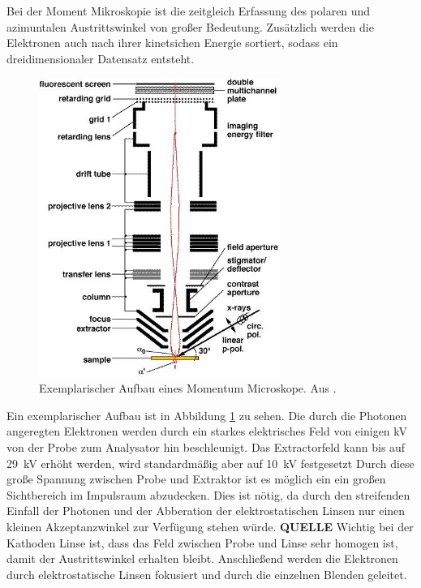         Bei der Moment Mikroskopie ist die zeitgleich Erfassung des polaren und azimuntalen Austrittswinkel von großer Bedeutung. 
        Zusätzlich werden die Elektronen auch nach ihrer kinetsichen Energie sortiert, sodass ein dreidimensionaler Datensatz entsteht.

        \begin{figure}
            \centering
            \includegraphics[width=0.7\textwidth]{./content/PEEM_schemaneu.jpg}
            \caption{Exemplarischer Aufbau eines Momentum Microskope. Aus \cite{KUCH}.}
            \label{fig:MM}
        \end{figure}
        Ein exemplarischer Aufbau ist in Abbildung \ref{fig:MM} zu sehen.
        Die durch die Photonen angeregten Elektronen werden durch ein starkes elektrisches Feld von einigen \si{\kilo\volt} von der Probe zum Analysator hin beschleunigt.
        Das Extractorfeld kann bis auf \SI{29}{\kilo\volt} erhöht werden, wird standardmäßig aber auf \SI{10}{\kilo\volt} festgesetzt
        Durch diese große Spannung zwischen Probe und Extraktor ist es möglich ein ein großen Sichtbereich im Impulsraum abzudecken.
        Dies ist nötig, da durch den streifenden Einfall der Photonen und der Abberation der elektrostatischen Linsen nur einen kleinen Akzeptanzwinkel zur Verfügung stehen würde. \textbf{QUELLE}
        Wichtig bei der Kathoden Linse ist, dass das Feld zwischen Probe und Linse sehr homogen ist, damit der Austrittswinkel erhalten bleibt.
        Anschließend werden die Elektronen durch elektrostatische Linsen fokusiert und durch die einzelnen Blenden geleitet.
